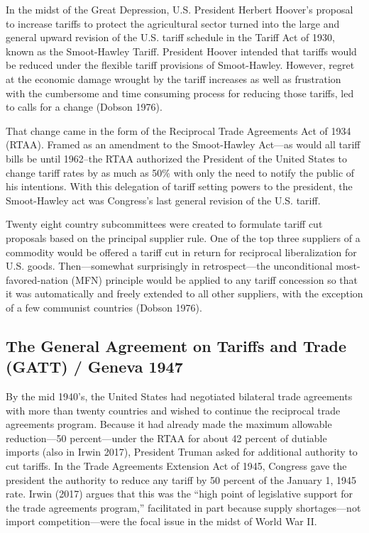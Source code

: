 \documentclass[
  12pt,
]{article}
\begin{document}
In the midst of the Great Depression, U.S. President Herbert Hoover's proposal to increase tariffs to protect the agricultural sector turned into the large and general upward revision of the U.S. tariff schedule in the Tariff Act of 1930, known as the Smoot-Hawley Tariff. President Hoover intended that tariffs would be reduced under the flexible tariff provisions of Smoot-Hawley. However, regret at the economic damage wrought by the tariff increases as well as frustration with the cumbersome and time consuming process for reducing those tariffs, led to calls for a change (Dobson 1976).

That change came in the form of the Reciprocal Trade Agreements Act of 1934 (RTAA). Framed as an amendment to the Smoot-Hawley Act---as would all tariff bills be until 1962--the RTAA authorized the President of the United States to change tariff rates by as much as 50\% with only the need to notify the public of his intentions. With this delegation of tariff setting powers to the president, the Smoot-Hawley act was Congress's last general revision of the U.S. tariff.

Twenty eight country subcommittees were created to formulate tariff cut proposals based on the principal supplier rule. One of the top three suppliers of a commodity would be offered a tariff cut in return for reciprocal liberalization for U.S. goods. Then---somewhat surprisingly in retrospect---the unconditional most-favored-nation (MFN) principle would be applied to any tariff concession so that it was automatically and freely extended to all other suppliers, with the exception of a few communist countries (Dobson 1976).

\hypertarget{the-general-agreement-on-tariffs-and-trade-gatt-geneva-1947}{%
\subsection{The General Agreement on Tariffs and Trade (GATT) / Geneva 1947}\label{the-general-agreement-on-tariffs-and-trade-gatt-geneva-1947}}

By the mid 1940's, the United States had negotiated bilateral trade agreements with more than twenty countries and wished to continue the reciprocal trade agreements program. Because it had already made the maximum allowable reduction---50 percent---under the RTAA for about 42 percent of dutiable imports (also in Irwin 2017), President Truman asked for additional authority to cut tariffs. In the Trade Agreements Extension Act of 1945, Congress gave the president the authority to reduce any tariff by 50 percent of the January 1, 1945 rate. Irwin (2017) argues that this was the ``high point of legislative support for the trade agreements program,'' facilitated in part because supply shortages---not import competition---were the focal issue in the midst of World War II.
\end{document}
